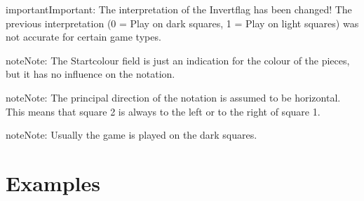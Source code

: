 \documentclass[letterpaper,10pt,english]{sphinxmanual}
\begin{document}
\begin{sphinxadmonition}{important}{Important:}
\sphinxAtStartPar
The interpretation of the Invert\sphinxhyphen{}flag has been changed! The previous
interpretation (0 = Play on dark squares, 1 = Play on light squares)
was not accurate for certain game types.
\end{sphinxadmonition}

\begin{sphinxadmonition}{note}{Note:}
\sphinxAtStartPar
The Start\sphinxhyphen{}colour field is just an indication for the colour of the
pieces, but it has no influence on the notation.
\end{sphinxadmonition}

\begin{sphinxadmonition}{note}{Note:}
\sphinxAtStartPar
The principal direction of the notation is assumed to be horizontal.
This means that square 2 is always to the left or to the right of square 1.
\end{sphinxadmonition}

\begin{sphinxadmonition}{note}{Note:}
\sphinxAtStartPar
Usually the game is played on the dark squares.
\end{sphinxadmonition}


\section{Examples}
\label{\detokenize{gametype:examples}}
\begin{sphinxVerbatim}[commandchars=\\\{\}]
\PYG{p}{[} \PYG{p}{]}                    
\PYG{p}{[} \PYG{p}{]}              
\PYG{p}{[} \PYG{p}{]}                   
\PYG{p}{[} \PYG{p}{]}           
\end{sphinxVerbatim}
\end{document}
